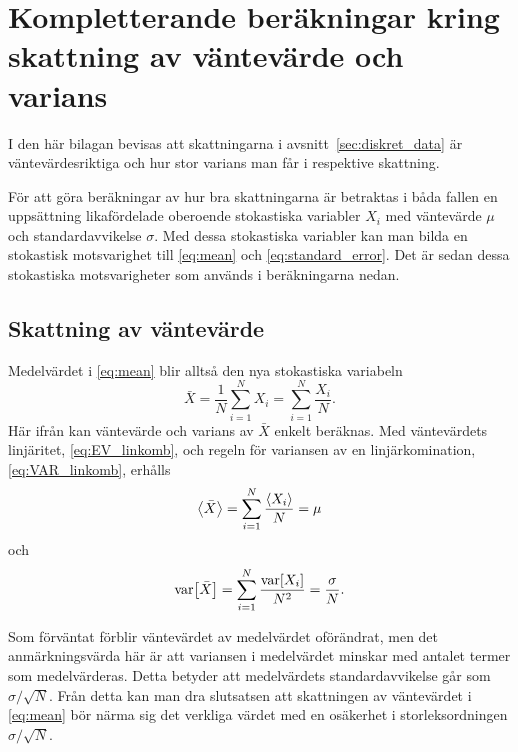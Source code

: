 \chapter{Kompletterande beräkningar kring skattning av väntevärde och varians}
\label{sec:noggrannhet}

I den här bilagan bevisas att skattningarna i avsnitt~\ref{sec:diskret_data} är väntevärdesriktiga och hur stor varians man får i respektive skattning.

För att göra beräkningar av hur bra skattningarna är betraktas i båda fallen en uppsättning likafördelade oberoende stokastiska variabler $X_i$ med väntevärde $\mu$ och standardavvikelse $\sigma$. Med dessa stokastiska variabler kan man bilda en stokastisk motsvarighet\footnotemark{} till \eqref{eq:mean} och \eqref{eq:standard_error}. Det är sedan dessa stokastiska motsvarigheter som används i beräkningarna nedan. 



\section{Skattning av väntevärde}
Medelvärdet i \eqref{eq:mean} blir alltså den nya stokastiska variabeln
\begin{equation}
\bar{X} = \frac{1}{N} \sum_{i=1}^N X_i = \sum_{i=1}^N \frac{X_i}{N}.
\end{equation}
Här ifrån kan väntevärde och varians av $\bar{X}$ enkelt beräknas. Med väntevärdets linjäritet, \eqref{eq:EV_linkomb}, och regeln för variansen av en linjärkomination, \eqref{eq:VAR_linkomb}, erhålls
\begin{equation}
\ev{\bar{X}} = \sum_{i=1}^N \frac{\ev{X_i}}{N} = \mu
\end{equation}
och
\begin{equation}
\text{var}\!\left[\bar{X}\right] = \sum_{i=1}^N \frac{\text{var}\!\left[X_i\right]}{N^2} = \frac{\sigma}{N}.
\end{equation}

Som förväntat förblir väntevärdet av medelvärdet oförändrat, men det anmärkningsvärda här är att variansen i medelvärdet minskar med antalet termer som medelvärderas. Detta betyder att medelvärdets standardavvikelse går som $\sigma/\sqrt{N}$.
Från detta kan man dra slutsatsen att skattningen av väntevärdet i \eqref{eq:mean} bör närma sig det verkliga värdet med en osäkerhet i storleksordningen $\sigma/\sqrt{N}$. 

